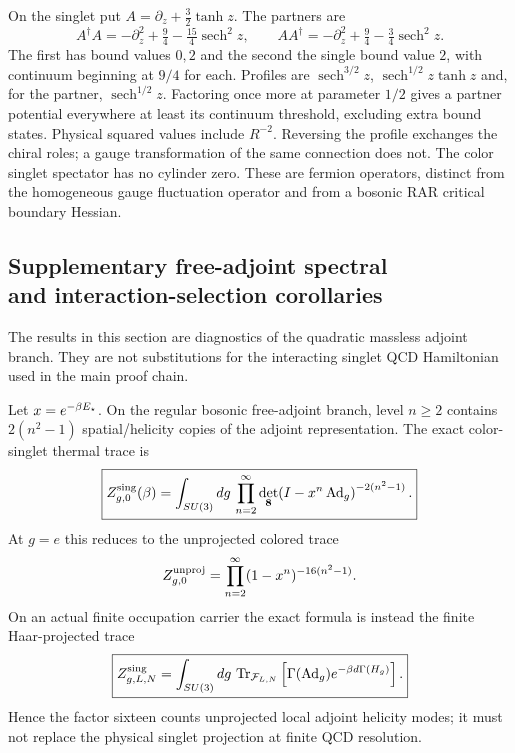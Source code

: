 \documentclass[12pt,a4paper]{article}
\begin{document}
On the singlet put $A=\partial_z+\tfrac32\tanh z$. The partners are
\[
 A^\dagger A=-\partial_z^2+\tfrac94-\tfrac{15}4\operatorname{sech}^2z,
 \qquad AA^\dagger=-\partial_z^2+\tfrac94-\tfrac34\operatorname{sech}^2z.
\]
The first has bound values $0,2$ and the second the single bound value
$2$, with continuum beginning at $9/4$ for each. Profiles are
$\operatorname{sech}^{3/2}z$, $\operatorname{sech}^{1/2}z\tanh z$ and,
for the partner, $\operatorname{sech}^{1/2}z$. Factoring once more at
parameter $1/2$ gives a partner potential everywhere at least its continuum
threshold, excluding extra bound states. Physical squared values include
$R^{-2}$. Reversing the profile exchanges the chiral roles; a gauge
transformation of the same connection does not. The color singlet
spectator has no cylinder zero. These are fermion operators, distinct
from the homogeneous gauge fluctuation operator and from a bosonic RAR
critical boundary Hessian.



\subsection[Supplementary free-adjoint spectral and interaction-selection corollaries]{Supplementary free-adjoint spectral\\and interaction-selection corollaries}
\label{p10:app:v245-free-adjoint-corollaries}
The results in this section are diagnostics of the quadratic massless adjoint
branch.  They are not substitutions for the interacting singlet QCD
Hamiltonian used in the main proof chain.

\begin{proposition}
\label{p10:prop:v245-singlet-projected-free-gluon-trace}
Let \(x=e^{-\beta E_\star}\).  On the regular bosonic free-adjoint branch, level
\(n\ge2\) contains \(2(n^2-1)\) spatial/helicity copies of the adjoint
representation.  The exact color-singlet thermal trace is
\[
 \boxed{
 Z_{g,0}^{\rm sing}(\beta)
 =\int_{SU(3)}dg\,
 \prod_{n=2}^{\infty}
 \det_{\mathbf8}\!\left(I-x^n\operatorname{Ad}_g\right)^{-2(n^2-1)}.}
\]
At \(g=e\) this reduces to the unprojected colored trace
\[
 Z_{g,0}^{\rm unproj}
 =\prod_{n=2}^{\infty}(1-x^n)^{-16(n^2-1)}.
\]
On an actual finite occupation carrier the exact formula is instead the
finite Haar-projected trace
\[
 \boxed{
 Z_{g,L,N}^{\rm sing}
 =\int_{SU(3)}dg\,
 \operatorname{Tr}_{\mathcal F_{L,N}}
 \left[\Gamma(\operatorname{Ad}_g)e^{-\beta d\Gamma(H_g)}\right].}
\]
Hence the factor sixteen counts unprojected local adjoint helicity modes; it
must not replace the physical singlet projection at finite QCD resolution.
\end{proposition}
\end{document}
